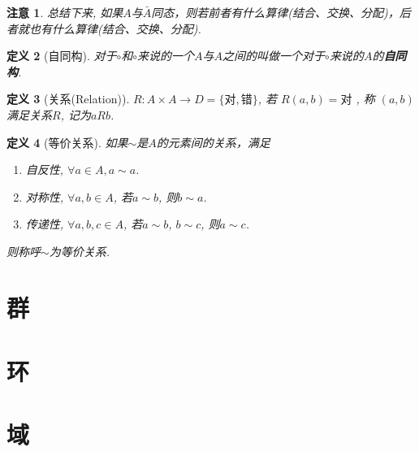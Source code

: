 \documentclass[UTF8]{ctexart}
\newtheorem{Definition}{定义}%
\newtheorem{Remark}[Definition]{注意}
\begin{document}
\begin{Remark}
总结下来, 如果$A$与$\bar{A}$同态，则若前者有什么算律(结合、交换、分配)，后者就也有什么算律(结合、交换、分配).
\end{Remark}

\begin{Definition}[自同构]
对于$\circ$和$\circ$来说的一个$A$与$A$之间的\;\;叫做一个对于$\circ$来说的$A$的\textbf{自同构}.
\end{Definition}

\begin{Definition}[关系(Relation)]
$R: A \times A \rightarrow D = \{\text{对}, \text{错}\} $, 
若
$R(a, b) = \text{对}$
, 称
$(a, b)$
满足关系$R$, 记为$aRb$.
\end{Definition}

\begin{Definition}[等价关系]
如果$\sim$是$A$的元素间的关系，满足 
\begin{enumerate}
\item 自反性, $\forall a \in A, a \sim a$.
\item 对称性, $\forall a, b \in A$, 若$a \sim b$, 则$b \sim a$.
\item 传递性, $\forall a, b, c \in A$, 若$a \sim b$, $b\sim c$, 则$a \sim c$.
\end{enumerate}
则称呼$\sim$为等价关系.
\end{Definition}


\section{群}
\section{环}
\section{域}
\end{document}
